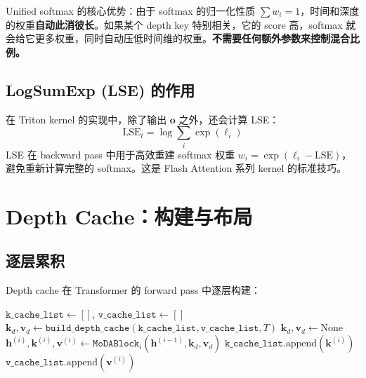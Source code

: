 \documentclass[11pt,a4paper]{article}
\begin{document}
Unified softmax 的核心优势：由于 softmax 的归一化性质 $\sum w_i = 1$，时间和深度的权重\textbf{自动此消彼长}。如果某个 depth key 特别相关，它的 score 高，softmax 就会给它更多权重，同时自动压低时间维的权重。\textbf{不需要任何额外参数来控制混合比例。}

\subsection{LogSumExp (LSE) 的作用}

在 Triton kernel 的实现中，除了输出 $\mathbf{o}$ 之外，还会计算 LSE：
\begin{equation}
  \text{LSE}_t = \log \sum_{i} \exp(\ell_i)
\end{equation}
LSE 在 backward pass 中用于高效重建 softmax 权重 $w_i = \exp(\ell_i - \text{LSE})$，避免重新计算完整的 softmax。这是 Flash Attention 系列 kernel 的标准技巧。

\section{Depth Cache：构建与布局}

\subsection{逐层累积}

Depth cache 在 Transformer 的 forward pass 中逐层构建：

\begin{algorithm}[H]
\caption{Depth Cache 累积过程}
\begin{algorithmic}[1]
\State $\texttt{k\_cache\_list} \gets []$, $\texttt{v\_cache\_list} \gets []$
    \State $\mathbf{k}_d, \mathbf{v}_d \gets \texttt{build\_depth\_cache}(\texttt{k\_cache\_list}, \texttt{v\_cache\_list}, T)$
  \Else
    \State $\mathbf{k}_d, \mathbf{v}_d \gets \text{None}$
  \EndIf
  \State $\mathbf{h}^{(i)}, \mathbf{k}^{(i)}, \mathbf{v}^{(i)} \gets \texttt{MoDABlock}_i(\mathbf{h}^{(i-1)}, \mathbf{k}_d, \mathbf{v}_d)$
  \State $\texttt{k\_cache\_list}.\text{append}(\mathbf{k}^{(i)})$
  \State $\texttt{v\_cache\_list}.\text{append}(\mathbf{v}^{(i)})$
\EndFor
\end{algorithmic}
\end{algorithm}
\end{document}
